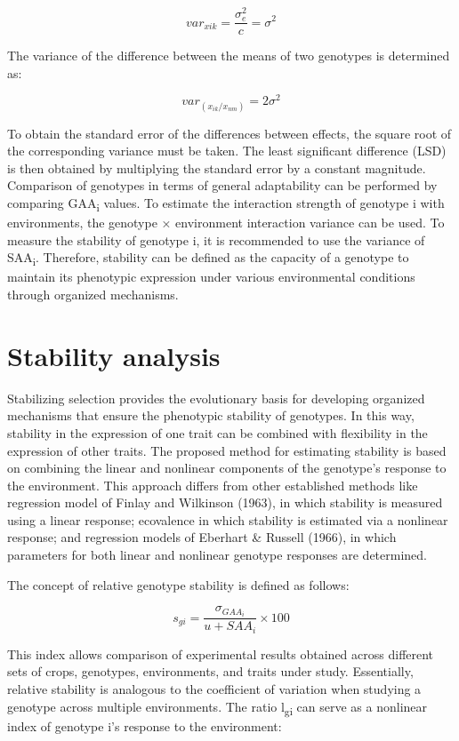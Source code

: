 \documentclass[
]{article}
\begin{document}
\[{var}_{xik} = \frac{\sigma_{e}^{2}}{c} = \sigma^{2}\]

The variance of the difference between the means of two genotypes is
determined as:

\[{var}_{(x_{ik}/x_{nm})} = 2\sigma^{2}\]

To obtain the standard error of the differences between effects, the
square root of the corresponding variance must be taken. The least
significant difference (LSD) is then obtained by multiplying the
standard error by a constant magnitude. Comparison of genotypes in terms
of general adaptability can be performed by comparing
GAA\textsubscript{i} values. To estimate the interaction strength of
genotype i with environments, the genotype × environment interaction
variance can be used. To measure the stability of genotype i, it is
recommended to use the variance of SAA\textsubscript{i}. Therefore,
stability can be defined as the capacity of a genotype to maintain its
phenotypic expression under various environmental conditions through
organized mechanisms.

\hypertarget{stability-analysis}{%
\section{Stability analysis}\label{stability-analysis}}

Stabilizing selection provides the evolutionary basis for developing
organized mechanisms that ensure the phenotypic stability of genotypes.
In this way, stability in the expression of one trait can be combined
with flexibility in the expression of other traits. The proposed method
for estimating stability is based on combining the linear and nonlinear
components of the genotype's response to the environment. This approach
differs from other established methods like regression model of Finlay
and Wilkinson (1963), in which stability is measured using a linear
response; ecovalence in which stability is estimated via a nonlinear
response; and regression models of Eberhart \& Russell (1966), in which
parameters for both linear and nonlinear genotype responses are
determined.

The concept of relative genotype stability is defined as follows:

\[s_{gi} = \frac{\sigma_{{GAA}_{i}}}{u + {SAA}_{i}} \times 100\]

This index allows comparison of experimental results obtained across
different sets of crops, genotypes, environments, and traits under
study. Essentially, relative stability is analogous to the coefficient
of variation when studying a genotype across multiple environments. The
ratio l\textsubscript{gi} can serve as a nonlinear index of genotype i's
response to the environment:
\end{document}
